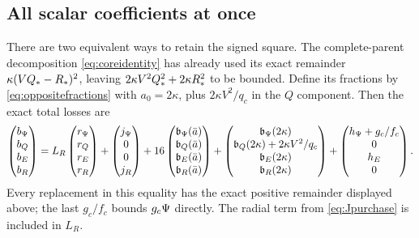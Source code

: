 \subsection*{All scalar coefficients at once}
There are two equivalent ways to retain the signed square.
The complete-parent decomposition \eqref{eq:coreidentity} has already
used its exact remainder $\kappa(VQ_*-R_*)^2$, leaving
$2\kappa V^2Q_*^2+2\kappa R_*^2$ to be bounded.
Define its fractions by \eqref{eq:oppositefractions} with $a_0=2\kappa$,
plus $2\kappa V^2/q_c$ in the $Q$ component. Then the exact total losses are
\begin{equation}
 \begin{pmatrix}b_\Psi\\b_Q\\b_E\\b_R\end{pmatrix}
 =
 L_R\begin{pmatrix}r_\Psi\\r_Q\\r_E\\r_R\end{pmatrix}
 +\begin{pmatrix}j_\Psi\\0\\0\\j_R\end{pmatrix}
 +16\begin{pmatrix}\mathfrak b_\Psi(\bar a)\\
                    \mathfrak b_Q(\bar a)\\
                    \mathfrak b_E(\bar a)\\
                    \mathfrak b_R(\bar a)\end{pmatrix}
 +\begin{pmatrix}\mathfrak b_\Psi(2\kappa)\\
 \mathfrak b_Q(2\kappa)+2\kappa V^2/q_c\\
 \mathfrak b_E(2\kappa)\\\mathfrak b_R(2\kappa)\end{pmatrix}
 +\begin{pmatrix}h_\Psi+g_c/f_c\\0\\h_E\\0\end{pmatrix}.
 \label{eq:totallosses}
\end{equation}
Every replacement in this equality has the exact positive
remainder displayed above; the last $g_c/f_c$ bounds $g_c\Psi$ directly.
The radial term from \eqref{eq:Jpurchase} is included in $L_R$.


